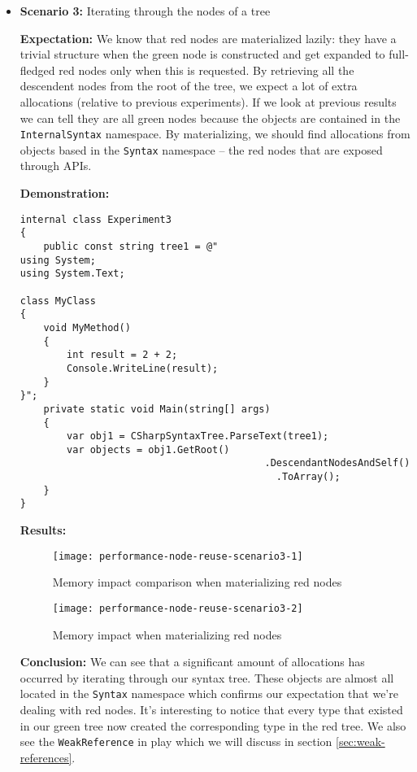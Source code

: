 \begin{itemize}
\item \textbf{Scenario 3:} Iterating through the nodes of a tree

\textbf{Expectation:} We know that red nodes are materialized lazily: they have a trivial structure when the green node is constructed and get expanded to full-fledged red nodes only when this is requested. By retrieving all the descendent nodes from the root of the tree, we expect a lot of extra allocations (relative to previous experiments). If we look at previous results we can tell they are all green nodes because the objects are contained in the \texttt{InternalSyntax} namespace. By materializing, we should find allocations from objects based in the \texttt{Syntax} namespace -- the red nodes that are exposed through APIs.

\textbf{Demonstration:} 

\begin{lstlisting}
internal class Experiment3
{
    public const string tree1 = @"
using System;
using System.Text;

class MyClass 
{
    void MyMethod()
    {
        int result = 2 + 2;
        Console.WriteLine(result);
    }
}";
    private static void Main(string[] args)
	{
		var obj1 = CSharpSyntaxTree.ParseText(tree1);
		var objects = obj1.GetRoot()
										  .DescendantNodesAndSelf()
											.ToArray();
	}
}
\end{lstlisting}

\textbf{Results:}

\begin{figure}[H]
\centering
\texttt{[image: performance-node-reuse-scenario3-1]}
\caption{Memory impact comparison when materializing red nodes}
\label{img:performance-node-reuse-scenario3-1}
\end{figure}

\begin{figure}[H]
\centering
\texttt{[image: performance-node-reuse-scenario3-2]}
\caption{Memory impact when materializing red nodes}
\label{img:performance-node-reuse-scenario3-2}
\end{figure}

\textbf{Conclusion:} We can see that a significant amount of allocations has occurred by iterating through our syntax tree. These objects are almost all located in the \texttt{Syntax} namespace which confirms our expectation that we're dealing with red nodes. It's interesting to notice that every type that existed in our green tree now created the corresponding type in the red tree. We also see the \texttt{WeakReference} in play which we will discuss in section \ref{sec:weak-references}.




\end{itemize}